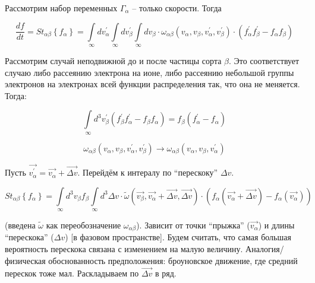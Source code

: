 \documentclass[10pt, a4paper]{article}
\begin{document}
Рассмотрим набор переменных $\Gamma_\alpha$ -- только скорости. Тогда

\begin{equation*}
	\frac{df}{dt} = St_{\alpha\beta}\left\lbrace f_\alpha\right\rbrace = \int\limits_{\infty}dv_\alpha^{'} \int\limits_{\infty}dv_\beta^{'} \int\limits_{\infty}dv_\beta \cdot \omega_{\alpha\beta}\left(v_\alpha, v_\beta, v_\alpha^{'}, v_\beta^{'}\right) \cdot (f_{\alpha}^{'}f_{\beta}^{'}-f_{\alpha}f_{\beta})
\end{equation*}

Рассмотрим случай неподвижной до и после частицы сорта $\beta$. Это соответствует случаю либо рассеянию электрона на ионе, либо рассеянию небольшой группы электронов на электронах всей функции распределения так, что она не меняется. Тогда:

\begin{equation*}
	\int\limits_{\infty} d^3v_\beta^{'}\left(f_\beta^{'}f_\alpha^{'}-f_\beta f_\alpha\right) = f_\beta\left(f_\alpha^{'}-f_\alpha\right)
\end{equation*}

\begin{equation*}
	\omega_{\alpha\beta}\left(v_\alpha, v_\beta, v_\alpha^{'}, v_\beta^{'}\right) \rightarrow \omega_{\alpha\beta}\left(v_\alpha, v_\beta, v_\alpha^{'}\right)
\end{equation*}

Пусть $\overrightarrow{v_\alpha^{'}}=\overrightarrow{v_\alpha}+\overrightarrow{\Delta v}$. Перейдём к интералу по ``перескоку'' $\Delta v$.

\begin{equation*}
	St_{\alpha\beta}\left\lbrace f_\alpha\right\rbrace = \int\limits_{\infty}d^3v_\beta f_\beta \int\limits_{\infty} d^3\Delta v \cdot \widetilde{\omega}(\overrightarrow{v_\beta}, \overrightarrow{v_\alpha}+\overrightarrow{\Delta v}, \overrightarrow{\Delta v}) \cdot \left(f_\alpha\left(\overrightarrow{v_\alpha}+\overrightarrow{\Delta v}\right)-f_\alpha\left(\overrightarrow{v_\alpha}\right)\right)
\end{equation*}

(введена $\widetilde{\omega}$ как переобозначение $\omega_{\alpha\beta}$). Зависит от точки ``прыжка'' ($\overrightarrow{v_\alpha}$) и длины ``перескока'' ($\Delta v$) [в фазовом пространстве]. Будем считать, что самая большая вероятность перескока связана с изменением на малую величину. Аналогия/физическая обоснованность предположения: броуновское движение, где средний перескок тоже мал. Раскладываем по $\overrightarrow{\Delta v}$ в ряд.
\end{document}
